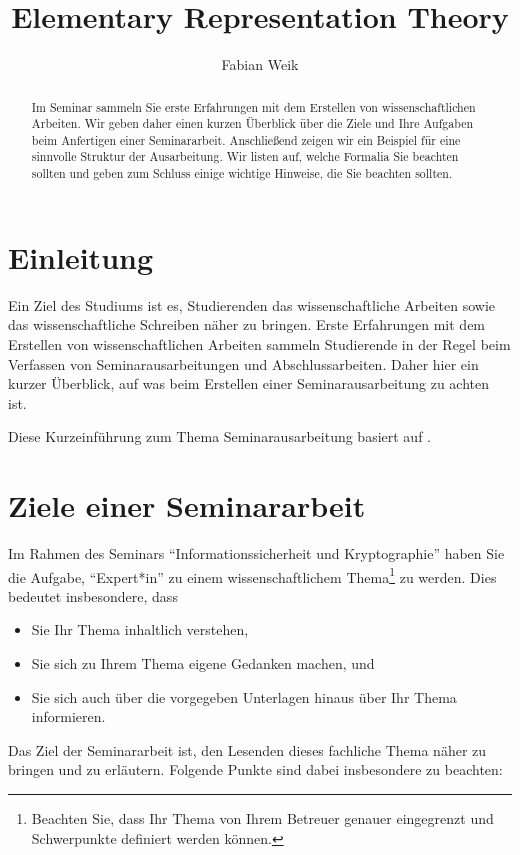 \documentclass[lang=english]{secseminar}
\title{Elementary Representation Theory}
\author{Fabian Weik}
\begin{document}


\begin{abstract}
Im Seminar sammeln Sie erste Erfahrungen mit dem Erstellen von wissenschaftlichen Arbeiten.
Wir geben daher einen kurzen Überblick über die Ziele und Ihre Aufgaben beim Anfertigen einer
Seminararbeit.
Anschließend zeigen wir ein Beispiel für eine sinnvolle Struktur der Ausarbeitung.
Wir listen auf, welche Formalia Sie beachten sollten und geben zum Schluss einige wichtige Hinweise,
die Sie beachten sollten.
\end{abstract}

\section{Einleitung}
Ein Ziel des Studiums ist es, Studierenden das wissenschaftliche Arbeiten sowie
das wissenschaftliche Schreiben näher zu bringen. Erste Erfahrungen mit dem
Erstellen von wissenschaftlichen Arbeiten sammeln Studierende in der Regel
beim Verfassen von Seminarausarbeitungen und Abschlussarbeiten. Daher hier ein
kurzer Überblick, auf was beim Erstellen einer Seminarausarbeitung zu achten
ist.

\medskip Diese Kurzeinführung zum Thema Seminarausarbeitung basiert auf \cite{LIB,BOH07,KAR}.


\section{Ziele einer Seminararbeit}
Im Rahmen des Seminars ``Informationssicherheit und Kryptographie'' haben Sie die Aufgabe,
``Expert*in'' zu einem wissenschaftlichem Thema\footnote{Beachten Sie, dass Ihr Thema von Ihrem
Betreuer genauer eingegrenzt und Schwerpunkte definiert werden können.} zu werden. Dies bedeutet
insbesondere, dass
\begin{itemize}
\item Sie Ihr Thema inhaltlich verstehen,
\item Sie sich zu Ihrem Thema eigene Gedanken machen, und
\item Sie sich auch über die vorgegeben Unterlagen hinaus über Ihr Thema informieren.
\end{itemize}


Das Ziel der Seminararbeit ist, den Lesenden dieses fachliche Thema näher zu bringen und zu
erläutern. Folgende Punkte sind dabei insbesondere zu beachten:
\end{document}
